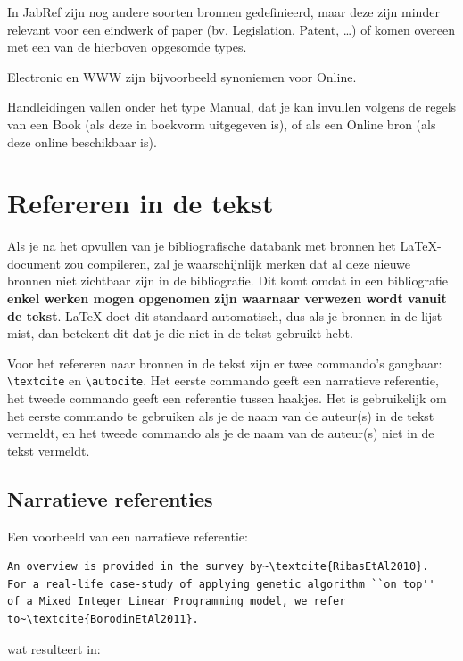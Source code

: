 In JabRef zijn nog andere soorten bronnen gedefinieerd, maar deze zijn minder relevant voor een eindwerk of paper (bv. Legislation, Patent, \ldots) of komen overeen met een van de hierboven opgesomde types.

Electronic en WWW zijn bijvoorbeeld synoniemen voor Online.

Handleidingen vallen onder het type Manual, dat je kan invullen volgens de regels van een Book (als deze in boekvorm uitgegeven is), of als een Online bron (als deze online beschikbaar is).

\section{Refereren in de tekst}%
\label{sec:bibliografie-refereren}

Als je na het opvullen van je bibliografische databank met bronnen het {\LaTeX}-do\-cu\-ment zou compileren, zal je waarschijnlijk merken dat al deze nieuwe bronnen niet zichtbaar zijn in de bibliografie. Dit komt omdat in een bibliografie \textbf{enkel werken mogen opgenomen zijn waarnaar verwezen wordt vanuit de tekst}. {\LaTeX} doet dit standaard automatisch, dus als je bronnen in de lijst mist, dan betekent dit dat je die niet in de tekst gebruikt hebt.

Voor het refereren naar bronnen in de tekst zijn er twee commando's gangbaar: \texttt{{\textbackslash}textcite} en \texttt{{\textbackslash}autocite}. Het eerste commando geeft een narratieve referentie, het tweede commando geeft een referentie tussen haakjes. Het is gebruikelijk om het eerste commando te gebruiken als je de naam van de auteur(s) in de tekst vermeldt, en het tweede commando als je de naam van de auteur(s) niet in de tekst vermeldt.

\subsection{Narratieve referenties}%
\label{ssec:narratieve_referenties}

Een voorbeeld van een narratieve referentie:

\begin{verbatim}
An overview is provided in the survey by~\textcite{RibasEtAl2010}.
For a real-life case-study of applying genetic algorithm ``on top''
of a Mixed Integer Linear Programming model, we refer
to~\textcite{BorodinEtAl2011}.
\end{verbatim}

wat resulteert in:

